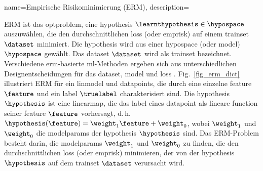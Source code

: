 {{{{
{name={Empirische Risikominimierung (ERM)}, 
	description={ERM ist das \gls{optproblem}, 
	eine \gls{hypothesis} $\learnthypothesis \in \hypospace$ auszuwählen, die den 
	durchschnittlichen \gls{loss} (oder \gls{emprisk}) auf einem \gls{trainset} $\dataset$ minimiert. 
	Die \gls{hypothesis} wird aus einer \gls{hypospace} (oder \gls{model}) $\hypospace$ gewählt. 
	Das \gls{dataset} $\dataset$ wird als \gls{trainset} bezeichnet. Verschiedene \gls{erm}-basierte 
	\gls{ml}-Methoden ergeben sich aus unterschiedlichen Designentscheidungen für das \gls{dataset}, 
	\gls{model} und \gls{loss} \cite[Ch. 3]{MLBasics}. 
	Fig.\ \ref{fig_erm_dict} illustriert ERM für ein \gls{linmodel} 
	und \glspl{datapoint}, die durch eine einzelne \gls{feature} $\feature$ und ein \gls{label} $\truelabel$ charakterisiert sind. 
	Die \gls{hypothesis} $\hypothesis$ ist eine \gls{linearmap}, die das \gls{label} 
	eines \gls{datapoint} als lineare \gls{function} seiner \gls{feature} $\feature$ vorhersagt, d.\,h. 
	$\hypothesis(\feature) = \weight_{1} \feature + \weight_{0}$, wobei $\weight_{1}$ 
	und $\weight_{0}$ die \glspl{modelparam} der \gls{hypothesis} $\hypothesis$ sind. 
	Das ERM-Problem besteht darin, die \glspl{modelparam} $\weight_{1}$ und $\weight_{0}$ zu finden, die 
	den durchschnittlichen \gls{loss} (oder \gls{emprisk}) minimieren, der von der \gls{hypothesis} 
	$\hypothesis$ auf dem \gls{trainset} $\dataset$ verursacht wird.
    \begin{figure}[H]
\begin{center}
\end{center}
\end{figure}}}}}}}
